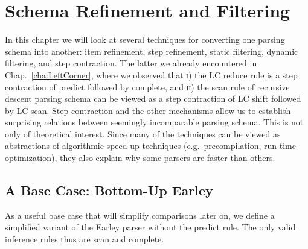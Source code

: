 \chapter{Schema Refinement and Filtering}
\label{cha:Unify}

In this chapter we will look at several techniques for converting one parsing schema into another: item refinement, step refinement, static filtering, dynamic filtering, and step contraction.
The latter we already encountered in Chap.~\ref{cha:LeftCorner}, where we observed that \textsc{i}) the LC reduce rule is a step contraction of predict followed by complete, and \textsc{ii}) the scan rule of recursive descent parsing schema can be viewed as a step contraction of LC shift followed by LC scan.
Step contraction and the other mechanisms allow us to establish surprising relations between seemingly incomparable parsing schema.
This is not only of theoretical interest.
Since many of the techniques can be viewed as abstractions of algorithmic speed-up techniques (e.g.\ precompilation, run-time optimization), they also explain why some parsers are faster than others.

\section{A Base Case: Bottom-Up Earley}

As a useful base case that will simplify comparisons later on, we define a simplified variant of the Earley parser without the predict rule.
The only valid inference rules thus are scan and complete.

